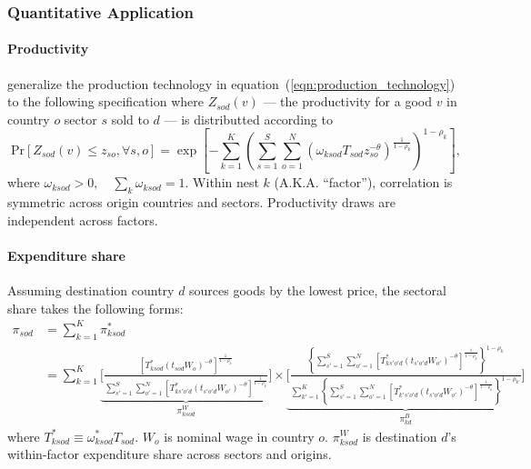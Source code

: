 \subsubsection{Quantitative Application}
\paragraph{Productivity}
\cite{Lind:2023} generalize the production technology in equation~(\ref{eqn:production_technology})
to the following specification where 
$Z_{sod}(v)$ --- the productivity for a good $v$ in country $o$ sector $s$ sold to $d$ ---
is distributted according to 
\begin{equation}
    \text{Pr}\left[Z_{s o d}(v) \leq z_{s o}, \forall s, o\right] = 
    \exp \left[-\sum_{k=1}^K\left(\sum_{s=1}^S \sum_{o=1}^N\left(\omega_{ksod} T_{s o d} z_{s o}^{-\theta}\right)^{\frac{1}{1-\rho_k}}\right)^{1-\rho_k}\right],
\end{equation}
where $\omega_{ksod} > 0, \quad \sum_{k} \omega_{ksod} = 1$.
Within nest $k$ (A.K.A. ``factor''), correlation is symmetric across origin countries and sectors.
Productivity draws are independent across factors.

\paragraph{Expenditure share}
Assuming destination country $d$ sources goods by the lowest price,
the sectoral share takes the following forms:
\begin{equation}
\label{eqn:fully_param_pi_sod}
\begin{aligned}  
    \pi_{sod} & = \sum_{k=1}^K \pi_{ksod}^* \\ 
    & = \sum_{k=1}^K 
    \underbrace{
    \bigg[\frac{\left[T_{ksod}^* \left(t_{sod} W_o\right)^{-\theta}\right]^{\frac{1}{1-\rho_k}}}{\sum_{s'=1}^S \sum_{o'=1}^N\left[T_{ks'o'd}^* \left(t_{s'o'd} W_{o'}\right)^{-\theta}\right]^{\frac{1}{1-\rho_k}}} 
    \bigg]
    }_{\pi_{ksod}^W}
    \times
    \underbrace{
    \bigg[\frac{\left\{\sum_{s'=1}^S \sum_{o'=1}^N\left[T_{ks'o'd}^* \left(t_{s' o' d} W_{o'}\right)^{-\theta}\right]^{\frac{1}{1-\rho_k}}\right\}^{1-\rho_k}}{\sum_{k'=1}^K\left\{\sum_{s'=1}^S \sum_{o'=1}^N\left[T_{k's'o'd}^* \left(t_{s'o'd} W_{o'}\right)^{-\theta}\right]^{\frac{1}{1-\rho_k}}\right\}^{1-\rho_{k'}}} \bigg]
    }_{\pi_{kd}^B}
\end{aligned}
\end{equation}
where $T_{ksod}^* \equiv \omega_{ksod}^* T_{sod}$.
$W_o$ is nominal wage in country $o$.
$\pi_{ksod}^W$ is destination $d$'s within-factor expenditure share across sectors and origins.

